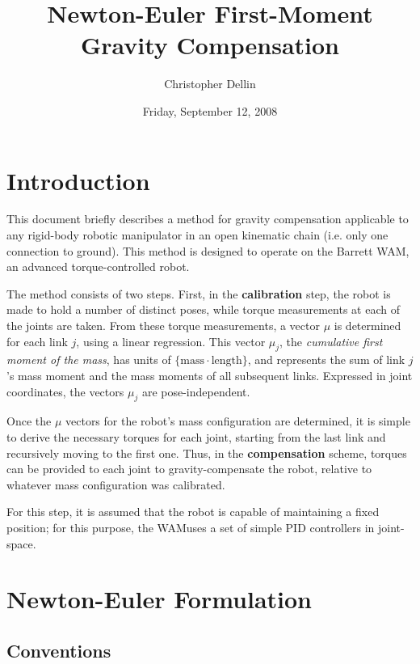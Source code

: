 \documentclass[letterpaper,12pt]{article}
\title{Newton-Euler First-Moment Gravity Compensation}
\author{Christopher Dellin}
\date{Friday, September 12, 2008}
\newcommand{\wam}{WAM{\scriptsize \texttrademark}}
\begin{document}
\maketitle

\tableofcontents

\section{Introduction}

This document briefly describes a method for gravity compensation
applicable to any rigid-body robotic manipulator in an open kinematic chain
(i.e. only one connection to ground).  This method is designed to operate
on the Barrett \wam, an advanced torque-controlled robot.

\vspace{0.1in}
The method consists of two steps.  First, in the \textbf{calibration} step,
the robot is made to hold a number of distinct poses, while torque
measurements at each of the joints are taken.  From these torque measurements,
a vector $\mu$ is determined for each link $j$, using a
linear regression.  This vector $\mu_j$, the \emph{cumulative first moment
of the mass}, has units of $\{\mbox{mass}\cdot\mbox{length}\}$, and
represents the sum of link $j$'s mass moment and the mass moments of all
subsequent links.  Expressed in joint coordinates, the vectors $\mu_j$
are pose-independent.

\vspace{0.1in}
Once the $\mu$ vectors for the robot's mass configuration are determined,
it is simple to derive the necessary torques for each joint, starting from
the last link and recursively moving to the first one.  Thus, in the
\textbf{compensation} scheme, torques can be provided to each joint to
gravity-compensate the robot, relative to whatever mass configuration
was calibrated.

For this step, it is assumed
that the robot is capable of maintaining a fixed position; for this purpose,
the \wam uses a set of simple PID controllers in joint-space.

\section{Newton-Euler Formulation}

   \subsection{Conventions}
  
\end{document}
